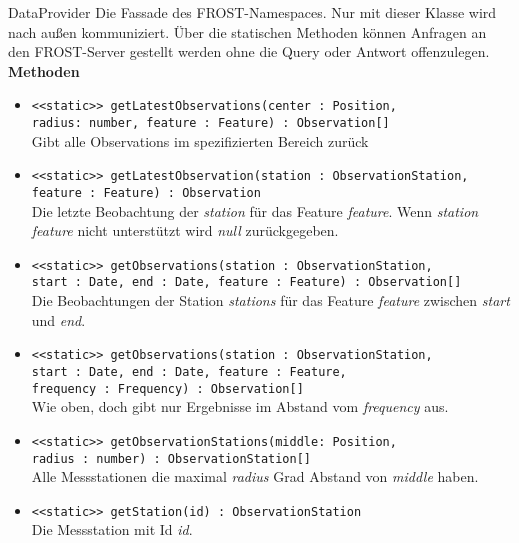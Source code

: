 \begin{Class}{DataProvider}
    Die Fassade des FROST-Namespaces. Nur mit dieser Klasse wird nach außen kommuniziert.
    Über die statischen Methoden können Anfragen an den FROST-Server gestellt werden ohne die Query oder Antwort offenzulegen.
    \bigskip\\
    \textbf{Methoden}
    \begin{itemize}
        \item \texttt{<<static>> getLatestObservations(center : Position,
        \\ radius: number, feature : Feature) : Observation[]}
        \\Gibt alle Observations im spezifizierten Bereich zurück
        \item \texttt{<<static>> getLatestObservation(station : ObservationStation,
        \\feature : Feature) : Observation}
        \\ Die letzte Beobachtung der \emph{station} für das Feature \emph{feature}.
        Wenn \emph{station} \emph{feature} nicht unterstützt wird \emph{null} zurückgegeben.
        \item \texttt{<<static>> getObservations(station : ObservationStation,
        \\ start : Date, end : Date, feature : Feature) : Observation[]}
        \\ Die Beobachtungen der Station \emph{stations} für das Feature \emph{feature}
        zwischen \emph{start} und \emph{end}.
        \item \texttt{<<static>> getObservations(station : ObservationStation,
        \\ start : Date, end : Date, feature : Feature,
        \\ frequency : Frequency) : Observation[]}
        \\ Wie oben, doch gibt nur Ergebnisse im Abstand vom \emph{frequency} aus.
        \item \texttt{<<static>> getObservationStations(middle: Position,
        \\ radius : number) : ObservationStation[]}
        \\ Alle Messstationen die maximal \emph{radius} Grad Abstand von \emph{middle} haben.
        \item \texttt{<<static>> getStation(id) : ObservationStation}
        \\ Die Messstation mit Id \emph{id}.
    \end{itemize}
\end{Class}

